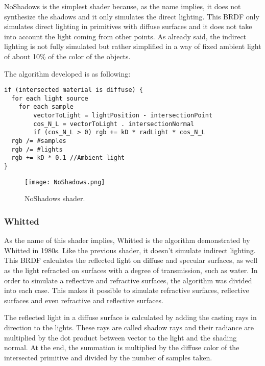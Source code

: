 \par
NoShadows is the simplest shader because, as the name implies, it does not synthesize the shadows and it only simulates the direct lighting.
This BRDF only simulates direct lighting in primitives with diffuse surfaces and it does not take into account the light coming from other points.
As already said, the indirect lighting is not fully simulated but rather simplified in a way of fixed ambient light of about 10\% of the color of the objects.

\par
The algorithm developed is as following:

\begin{lstlisting}
if (intersected material is diffuse) {
  for each light source
  	for each sample
	    vectorToLight = lightPosition - intersectionPoint
	    cos_N_L = vectorToLight . intersectionNormal
	    if (cos_N_L > 0) rgb += kD * radLight * cos_N_L
  rgb /= #samples
  rgb /= #lights
  rgb += kD * 0.1 //Ambient light
}
\end{lstlisting}

\begin{figure}[H]
	\centering
	\caption{NoShadows shader.}
	\label{NoShadows shader.}
	\texttt{[image: NoShadows.png]}
\end{figure}

\subsubsection{Whitted}

\par
As the name of this shader implies, Whitted is the algorithm demonstrated by Whitted in 1980s.
Like the previous shader, it doesn't simulate indirect lighting.
This BRDF calculates the reflected light on diffuse and specular surfaces, as well as the light refracted on surfaces with a degree of transmission, such as water.
In order to simulate a reflective and refractive surfaces, the algorithm was divided into each case.
This makes it possible to simulate refractive surfaces, reflective surfaces and even refractive and reflective surfaces.

\par
The reflected light in a diffuse surface is calculated by adding the casting rays in direction to the lights.
These rays are called shadow rays and their radiance are multiplied by the dot product between vector to the light and the shading normal.
At the end, the summation is multiplied by the diffuse color of the intersected primitive and divided by the number of samples taken.

